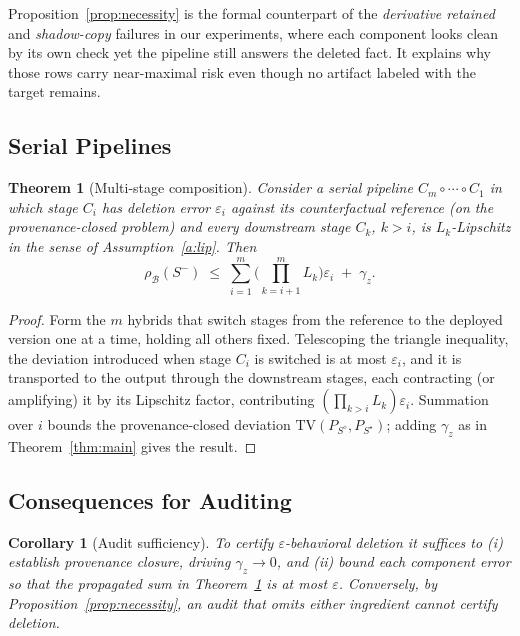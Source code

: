 \documentclass[10pt,journal,compsoc]{IEEEtran}
\newtheorem{theorem}{Theorem}
\newtheorem{corollary}{Corollary}
\begin{document}
Proposition~\ref{prop:necessity} is the formal counterpart of the
\emph{ derivative retained} and \emph{shadow-copy} failures in
our experiments, where each component looks clean by its own check yet
the pipeline still answers the deleted fact. It explains why those rows
carry near-maximal risk even though no artifact labeled with the target
remains.

\subsection{Serial Pipelines}

\begin{theorem}[Multi-stage composition]
\label{thm:general}
Consider a serial pipeline $C_{m}\circ\cdots\circ C_{1}$ in which stage
$C_{i}$ has deletion error $\varepsilon_{i}$ against its counterfactual
reference (on the provenance-closed problem) and every downstream stage
$C_{k}$, $k>i$, is $L_{k}$-Lipschitz in the sense of
Assumption~\ref{a:lip}. Then
\[
 \rho_{\mathcal{B}}(S^{-})
 \;\le\;
 \sum_{i=1}^{m}\Big(\textstyle\prod_{k=i+1}^{m}L_{k}\Big)\varepsilon_{i}
 \;+\;\gamma_{z}.
\]
\end{theorem}

\begin{proof}
Form the $m$ hybrids that switch stages from the reference to the
deployed version one at a time, holding all others fixed. Telescoping
the triangle inequality, the deviation introduced when stage $C_{i}$ is
switched is at most $\varepsilon_{i}$, and it is transported to the
output through the downstream stages, each contracting (or amplifying)
it by its Lipschitz factor, contributing
$(\prod_{k>i}L_{k})\varepsilon_{i}$. Summation over $i$ bounds the
provenance-closed deviation $\mathrm{TV}(P_{S^{\diamond}},P_{S^{\star}})$;
adding $\gamma_{z}$ as in Theorem~\ref{thm:main} gives the result.
\end{proof}

\subsection{Consequences for Auditing}

\begin{corollary}[Audit sufficiency]
\label{cor:audit}
To certify $\varepsilon$-behavioral deletion it suffices to (i) establish
provenance closure, driving $\gamma_{z}\to 0$, and (ii) bound each
component error so that the propagated sum in
Theorem~\ref{thm:general} is at most $\varepsilon$. Conversely, by
Proposition~\ref{prop:necessity}, an audit that omits either ingredient
cannot certify deletion.
\end{corollary}
\end{document}
